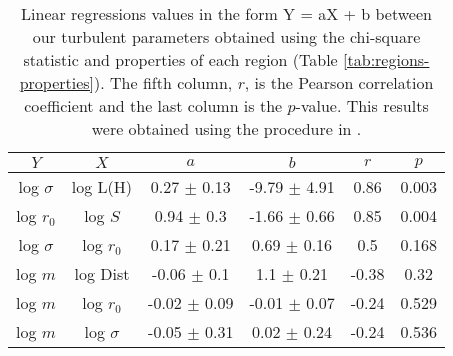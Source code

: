 \begin{table*}
\begin{center}
\caption{Linear regressions values in the form Y = aX + b between our turbulent parameters obtained using the chi-square statistic and properties of each region (Table \ref{tab:regions-properties}). The fifth column, $r$, is the Pearson correlation coefficient and the last column is the $p$-value. This results were obtained using the procedure in \citet{2007ApJ...665.1489K}.}
\begin{tabular}{cccccc}
\hline
            $Y$ &                   $X$ &                 $a$ &                 $b$ &       $r$ &      $p$ \\
\hline
 log $\sigma$ &            log L(H) &   0.27 $\pm$ 0.13 &  -9.79 $\pm$ 4.91 &   0.86 &  0.003 \\
    log $r_0$ &             log $S$ &    0.94 $\pm$ 0.3 &  -1.66 $\pm$ 0.66 &   0.85 &  0.004 \\
 log $\sigma$ &         log $r_{0}$ &   0.17 $\pm$ 0.21 &   0.69 $\pm$ 0.16 &    0.5 &  0.168 \\
      log $m$ &            log Dist &   -0.06 $\pm$ 0.1 &    1.1 $\pm$ 0.21 &  -0.38 &   0.32 \\
      log $m$ &         log $r_{0}$ &  -0.02 $\pm$ 0.09 &  -0.01 $\pm$ 0.07 &  -0.24 &  0.529 \\
      log $m$ &        log $\sigma$ &  -0.05 $\pm$ 0.31 &   0.02 $\pm$ 0.24 &  -0.24 &  0.536 \\
\bottomrule
\end{tabular}\label{tab:RestStats}
\end{center}
\end{table*}



